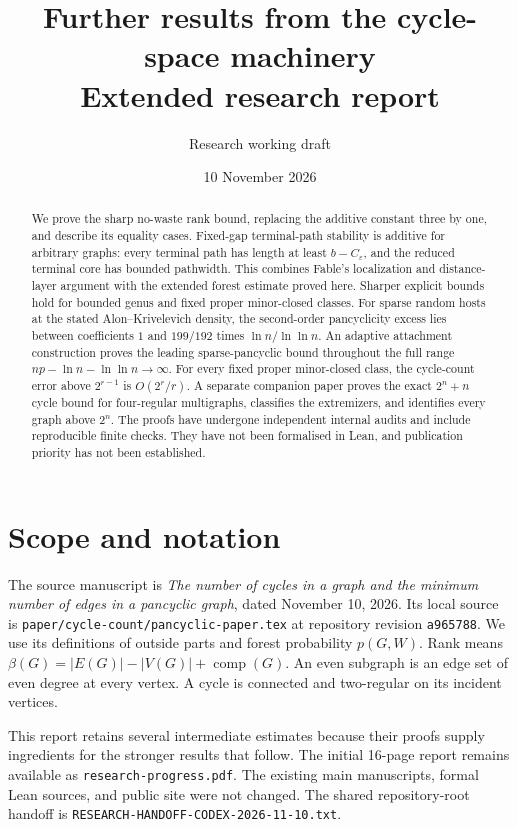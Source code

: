 \documentclass[11pt]{article}
\title{Further results from the cycle-space machinery\\Extended research report}
\author{Research working draft}
\date{10 November 2026}
\begin{document}
\maketitle

\begin{abstract}
We prove the sharp no-waste rank bound, replacing the additive constant three by one, and describe its equality cases.
Fixed-gap terminal-path stability is additive for arbitrary graphs: every terminal path has length at least $b-C_\varepsilon$, and the reduced terminal core has bounded pathwidth.
This combines Fable's localization and distance-layer argument with the extended forest estimate proved here.
Sharper explicit bounds hold for bounded genus and fixed proper minor-closed classes.
For sparse random hosts at the stated Alon--Krivelevich density, the second-order pancyclicity excess lies between coefficients $1$ and $199/192$ times $\ln n/\ln\ln n$.
An adaptive attachment construction proves the leading sparse-pancyclic bound throughout the full range $np-\ln n-\ln\ln n\to\infty$.
For every fixed proper minor-closed class, the cycle-count error above $2^{r-1}$ is $O(2^r/r)$.
A separate companion paper proves the exact $2^n+n$ cycle bound for four-regular multigraphs, classifies the extremizers, and identifies every graph above $2^n$.
The proofs have undergone independent internal audits and include reproducible finite checks.
They have not been formalised in Lean, and publication priority has not been established.
\end{abstract}

\section*{Scope and notation}
The source manuscript is \emph{The number of cycles in a graph and the minimum number of edges in a pancyclic graph}, dated November 10, 2026.
Its local source is \nolinkurl{paper/cycle-count/pancyclic-paper.tex} at repository revision \texttt{a965788}.
We use its definitions of outside parts and forest probability $p(G,W)$.
Rank means $\beta(G)=|E(G)|-|V(G)|+\operatorname{comp}(G)$.
An even subgraph is an edge set of even degree at every vertex.
A cycle is connected and two-regular on its incident vertices.

This report retains several intermediate estimates because their proofs supply ingredients for the stronger results that follow.
The initial 16-page report remains available as \nolinkurl{research-progress.pdf}.
The existing main manuscripts, formal Lean sources, and public site were not changed.
The shared repository-root handoff is \nolinkurl{RESEARCH-HANDOFF-CODEX-2026-11-10.txt}.
\end{document}
